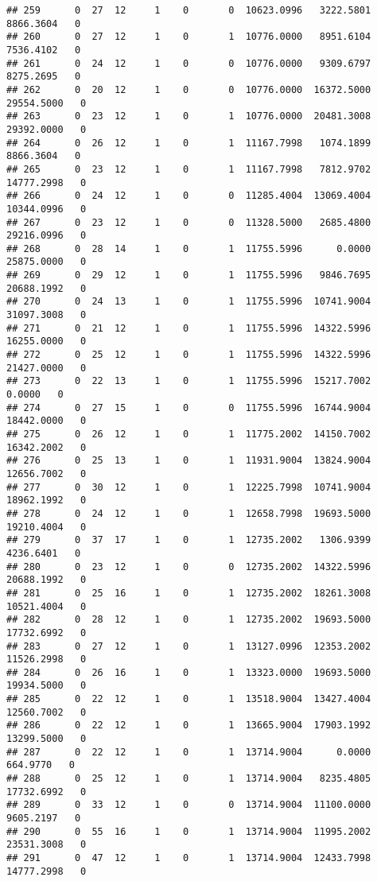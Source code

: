 \documentclass[
]{article}
\begin{document}
\begin{enumerate}
\begin{verbatim}
## 259      0  27  12     1    0       0  10623.0996   3222.5801   8866.3604   0
## 260      0  27  12     1    0       1  10776.0000   8951.6104   7536.4102   0
## 261      0  24  12     1    0       0  10776.0000   9309.6797   8275.2695   0
## 262      0  20  12     1    0       0  10776.0000  16372.5000  29554.5000   0
## 263      0  23  12     1    0       1  10776.0000  20481.3008  29392.0000   0
## 264      0  26  12     1    0       1  11167.7998   1074.1899   8866.3604   0
## 265      0  23  12     1    0       1  11167.7998   7812.9702  14777.2998   0
## 266      0  24  12     1    0       0  11285.4004  13069.4004  10344.0996   0
## 267      0  23  12     1    0       0  11328.5000   2685.4800  29216.0996   0
## 268      0  28  14     1    0       1  11755.5996      0.0000  25875.0000   0
## 269      0  29  12     1    0       1  11755.5996   9846.7695  20688.1992   0
## 270      0  24  13     1    0       1  11755.5996  10741.9004  31097.3008   0
## 271      0  21  12     1    0       1  11755.5996  14322.5996  16255.0000   0
## 272      0  25  12     1    0       1  11755.5996  14322.5996  21427.0000   0
## 273      0  22  13     1    0       1  11755.5996  15217.7002      0.0000   0
## 274      0  27  15     1    0       0  11755.5996  16744.9004  18442.0000   0
## 275      0  26  12     1    0       1  11775.2002  14150.7002  16342.2002   0
## 276      0  25  13     1    0       1  11931.9004  13824.9004  12656.7002   0
## 277      0  30  12     1    0       1  12225.7998  10741.9004  18962.1992   0
## 278      0  24  12     1    0       1  12658.7998  19693.5000  19210.4004   0
## 279      0  37  17     1    0       1  12735.2002   1306.9399   4236.6401   0
## 280      0  23  12     1    0       0  12735.2002  14322.5996  20688.1992   0
## 281      0  25  16     1    0       1  12735.2002  18261.3008  10521.4004   0
## 282      0  28  12     1    0       1  12735.2002  19693.5000  17732.6992   0
## 283      0  27  12     1    0       1  13127.0996  12353.2002  11526.2998   0
## 284      0  26  16     1    0       1  13323.0000  19693.5000  19934.5000   0
## 285      0  22  12     1    0       1  13518.9004  13427.4004  12560.7002   0
## 286      0  22  12     1    0       1  13665.9004  17903.1992  13299.5000   0
## 287      0  22  12     1    0       1  13714.9004      0.0000    664.9770   0
## 288      0  25  12     1    0       1  13714.9004   8235.4805  17732.6992   0
## 289      0  33  12     1    0       0  13714.9004  11100.0000   9605.2197   0
## 290      0  55  16     1    0       1  13714.9004  11995.2002  23531.3008   0
## 291      0  47  12     1    0       1  13714.9004  12433.7998  14777.2998   0

\end{verbatim}
\end{enumerate}
\end{document}
